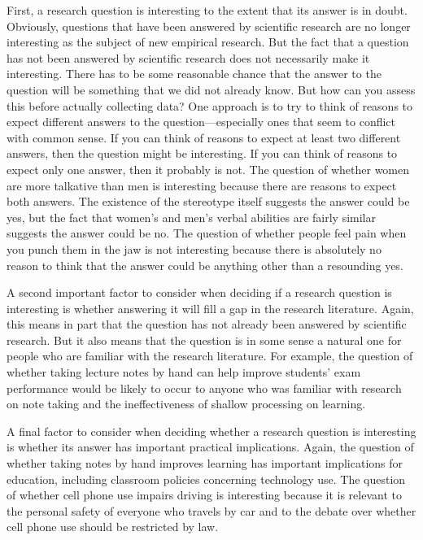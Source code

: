 First, a research question is interesting to the extent that its answer is in doubt. Obviously, questions that have been answered by scientific research are no longer interesting as the subject of new empirical research. But the fact that a question has not been answered by scientific research does not necessarily make it interesting. There has to be some reasonable chance that the answer to the question will be something that we did not already know. But how can you assess this before actually collecting data? One approach is to try to think of reasons to expect different answers to the question---especially ones that seem to conflict with common sense. If you can think of reasons to expect at least two different answers, then the question might be interesting. If you can think of reasons to expect only one answer, then it probably is not. The question of whether women are more talkative than men is interesting because there are reasons to expect both answers. The existence of the stereotype itself suggests the answer could be yes, but the fact that women's and men's verbal abilities are fairly similar suggests the answer could be no. The question of whether people feel pain when you punch them in the jaw is not interesting because there is absolutely no reason to think that the answer could be anything other than a resounding yes.

A second important factor to consider when deciding if a research question is interesting is whether answering it will fill a gap in the research literature. Again, this means in part that the question has not already been answered by scientific research. But it also means that the question is in some sense a natural one for people who are familiar with the research literature. For example, the question of whether taking lecture notes by hand can help improve students' exam performance would be likely to occur to anyone who was familiar with research on note taking and the ineffectiveness of shallow processing on learning.

A final factor to consider when deciding whether a research question is interesting is whether its answer has important practical implications. Again, the question of whether taking notes by hand improves learning has important implications for education, including classroom policies concerning technology use. The question of whether cell phone use impairs driving is interesting because it is relevant to the personal safety of everyone who travels by car and to the debate over whether cell phone use should be restricted by law.

